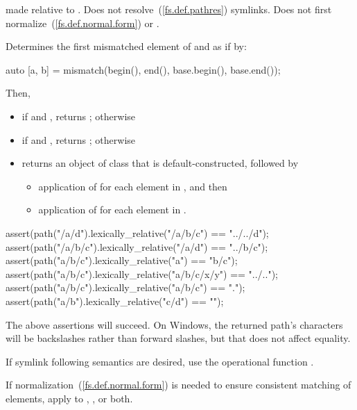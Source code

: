 \begin{itemdescr}
\pnum
\returns {} made relative to .
Does not resolve~(\ref{fs.def.pathres}) symlinks.
Does not first normalize~(\ref{fs.def.normal.form})  or .

\pnum
\effects
Determines the first mismatched element of  and 
as if by:
\begin{codeblock}
auto [a, b] = mismatch(begin(), end(), base.begin(), base.end());
\end{codeblock}
Then,
\begin{itemize}
\item if  and , returns ; otherwise
\item if  and , returns ; otherwise
\item returns an object of class  that is default-constructed, followed by
\begin{itemize}
\item application of 
  for each element in , and then
\item application of 
  for each element in .
\end{itemize}
\end{itemize}

\begin{example}
\begin{codeblock}
assert(path("/a/d").lexically_relative("/a/b/c") == "../../d");
assert(path("/a/b/c").lexically_relative("/a/d") == "../b/c");
assert(path("a/b/c").lexically_relative("a") == "b/c");
assert(path("a/b/c").lexically_relative("a/b/c/x/y") == "../..");
assert(path("a/b/c").lexically_relative("a/b/c") == ".");
assert(path("a/b").lexically_relative("c/d") == "");
\end{codeblock}
The above assertions will succeed.
On Windows, the returned path's  characters
will be backslashes rather than forward slashes,
but that does not affect  equality.
\end{example}

\begin{note} If symlink following semantics are desired,
  use the operational function . \end{note}

\begin{note} If normalization~(\ref{fs.def.normal.form}) is needed
  to ensure consistent matching of elements,
  apply  to
  , , or both. \end{note}
\end{itemdescr}

